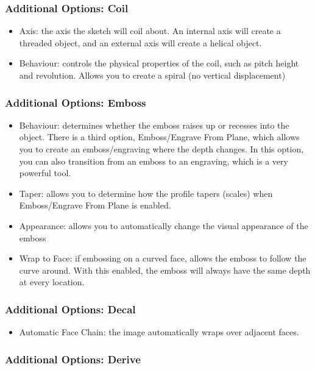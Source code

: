 \subsubsection{Additional Options: Coil}

\begin{itemize}
\item Axis: the axis the sketch will coil about. An internal axis will create a threaded object, and an external axis will create a helical object.
\item Behaviour: controls the physical properties of the coil, such as pitch height and revolution. Allows you to create a spiral (no vertical displacement)
\end{itemize}

\subsubsection{Additional Options: Emboss}

\begin{itemize}
\item Behaviour: determines whether the emboss raises up or recesses into the object. There is a third option, Emboss/Engrave From Plane, which allows you to create an emboss/engraving where the depth changes. In this option, you can also transition from an emboss to an engraving, which is a very powerful tool.
\item Taper: allows you to determine how the profile tapers (scales) when Emboss/Engrave From Plane is enabled.
\item Appearance: allows you to automatically change the visual appearance of the emboss
\item Wrap to Face: if embossing on a curved face, allows the emboss to follow the curve around. With this enabled, the emboss will always have the same depth at every location.
\end{itemize}

\subsubsection{Additional Options: Decal}

\begin{itemize}
    \item Automatic Face Chain: the image automatically wraps over adjacent faces.
\end{itemize}

\subsubsection{Additional Options: Derive}

